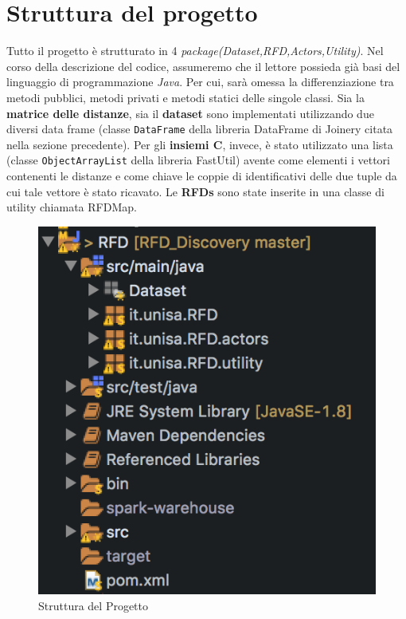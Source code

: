 \section{Struttura del progetto}
Tutto il progetto è strutturato in 4 \emph{package(Dataset,RFD,Actors,Utility)}.
Nel corso della descrizione del codice, assumeremo che il lettore possieda già basi del linguaggio di programmazione \emph{Java}. Per cui, sarà omessa la differenziazione tra metodi pubblici, metodi privati e metodi statici delle singole classi.
Sia la \textbf{matrice delle distanze}, sia il \textbf{dataset} sono implementati utilizzando due diversi data frame (classe \texttt{DataFrame} della libreria DataFrame di Joinery citata nella sezione precedente). Per gli \textbf{insiemi C}, invece, è stato utilizzato una lista (classe \texttt{ObjectArrayList} della libreria FastUtil) avente come elementi i vettori contenenti le distanze e come chiave le coppie di identificativi delle due tuple da cui tale vettore è stato ricavato.
Le \textbf{RFDs} sono state inserite in una classe di utility chiamata RFDMap.
\begin{figure}[H]
	\centering
	\includegraphics{Immagini/StrutturaProgetto.png}
	\caption{Struttura del Progetto}
	\label{fig:StrutturaProgetto}
\end{figure}
